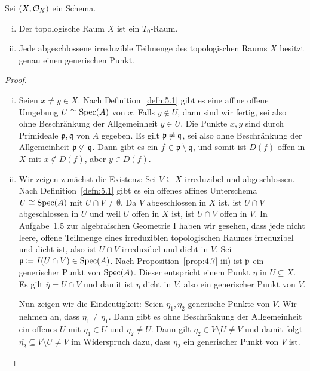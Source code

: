 \begin{prop} Sei $(X, \mathcal{O}_X)$ ein Schema.
	\begin{enumerate}[i)]
		\item Der topologische Raum $X$ ist ein $T_0$-Raum.
		\item Jede abgeschlossene irreduzible Teilmenge des topologischen Raums $X$ besitzt genau einen generischen Punkt.
	\end{enumerate}
	\begin{proof}
		\begin{enumerate}[i)]
			\item Seien $x\neq y \in X$. Nach Definition~\ref{defn:5.1} gibt es eine affine offene Umgebung $U \cong \operatorname{Spec}(A)$ von $x$. Falls $y \notin U$, dann sind wir fertig, sei also ohne Beschränkung der Allgemeinheit $y \in U$. Die Punkte $x,y$ sind durch Primideale $\mathfrak{p},\mathfrak{q}$ von $A$ gegeben. Es gilt $\mathfrak{p} \neq \mathfrak{q}$, sei also ohne Beschränkung der Allgemeinheit $\mathfrak{p} \not\subseteq \mathfrak{q}$. Dann gibt es ein $f \in \mathfrak{p} \setminus \mathfrak{q}$, und somit ist $D(f)$ offen in $X$ mit $x \notin D(f)$, aber $y\in D(f)$.
			\item Wir zeigen zunächst die Existenz: Sei $V\subseteq X$ irreduzibel und abgeschlossen. Nach Definition~\ref{defn:5.1} gibt es ein offenes affines Unterschema $U \cong \operatorname{Spec}(A)$ mit $U \cap V \neq \emptyset$. Da $V$ abgeschlossen in $X$ ist, ist $U \cap V$ abgeschlossen in $U$ und weil $U$ offen in $X$ ist, ist $U \cap V$ offen in $V$. In Aufgabe~1.5 zur algebraischen Geometrie I haben wir gesehen, dass jede nicht leere, offene Teilmenge eines irreduziblen topologischen Raumes irreduzibel und dicht ist, also ist $U \cap V$ irreduzibel und dicht in $V$. Sei $\mathfrak{p} \coloneqq I(U \cap V) \in \operatorname{Spec}(A)$. Nach Proposition~\ref{prop:4.7} iii) ist $\mathfrak{p}$ ein generischer Punkt von $\operatorname{Spec}(A)$. Dieser entspricht einem Punkt $\eta$ in $U \subseteq X$. Es gilt $\overline{\eta}=U\cap V$ und damit ist $\eta$ dicht in $V$, also ein generischer Punkt von $V$.

			Nun zeigen wir die Eindeutigkeit: Seien $\eta_1,\eta_2$ generische Punkte von $V$. Wir nehmen an, dass $\eta_1 \neq \eta_1$. Dann gibt es ohne Beschränkung der Allgemeinheit ein offenes $U$ mit $\eta_1 \in U$ und $\eta_2 \neq U$. Dann gilt $\eta_2 \in V\setminus U \neq V$ und damit folgt $\overline{\eta_2} \subseteq V\setminus U \neq V$ im Widerspruch dazu, dass $\eta_2$ ein generischer Punkt von $V$ ist.
		\end{enumerate}
	\end{proof}
\end{prop}

